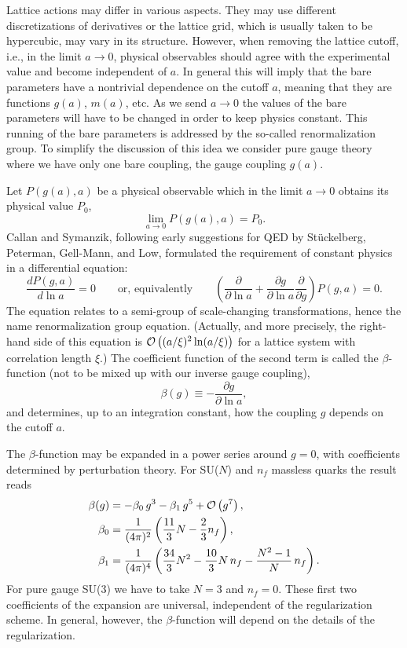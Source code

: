 Lattice actions may differ in various aspects. They may use different
discretizations of derivatives or the lattice grid, which is usually taken to
be hypercubic, may vary in its structure. However, when removing the lattice
cutoff, i.e., in the limit $a \to 0$, physical observables should agree with
the experimental value and become independent of $a$. In general this will
imply that the bare parameters have a nontrivial dependence on the cutoff $a$,
meaning that they are functions $g(a)$, $m(a)$, etc. As we send $a \to 0$ the
values of the bare parameters will have to be changed in order to keep physics
constant. This running of the bare parameters is addressed by the so-called
renormalization group. To simplify the discussion of this idea we consider pure
gauge theory where we have only one bare coupling, the gauge coupling $g(a)$.

Let $P(g(a), a)$ be a physical observable which in the limit $a \to 0$ obtains
its physical value $P_0$,
\begin{equation}
  \lim_{a\to 0} P(g(a), a) = P_0 .
\end{equation}
Callan and Symanzik, following early suggestions for QED by St\"uckelberg,
Peterman, Gell-Mann, and Low, formulated the requirement of constant physics in
a differential equation:
\begin{equation}
  \frac{dP(g, a)}{d\ln a} = 0 \qquad \text{or, equivalently} \qquad
  \left(\frac{\partial}{\partial\ln a} + \frac{\partial g}{\partial\ln a}
    \frac{\partial}{\partial g}\right) P(g, a) = 0 .
\end{equation}
The equation relates to a semi-group of scale-changing transformations, hence
the name renormalization group equation. (Actually, and more precisely, the
right-hand side of this equation is $\mathcal{O}\left((a/\xi)^2 \ln(a/\xi)\right)$ for a
lattice system with correlation length $\xi$.) The coefficient function of the
second term is called the $\beta$-function (not to be mixed up with our inverse
gauge coupling),
\begin{equation}
  \beta(g) \equiv -\frac{\partial g}{\partial\ln a} ,
\end{equation}
and determines, up to an integration constant, how the coupling $g$ depends on
the cutoff $a$.

The $\beta$-function may be expanded in a power series around $g = 0$, with
coefficients determined by perturbation theory. For SU($N$) and $n_f$ massless
quarks the result reads
\begin{equation}
\begin{aligned}
  \beta(g) &= -\beta_0\,g^3 - \beta_1\,g^5 + \mathcal{O}\left(g^7\right) ,\\
  \beta_0 &= \frac{1}{(4\pi)^2}\left(\frac{11}{3}N - \frac{2}{3}n_f\right) ,\\
  \beta_1 &= \frac{1}{(4\pi)^4}\left(\frac{34}{3}N^2 - \frac{10}{3}N\,n_f
    - \frac{N^2 - 1}{N}\,n_f\right) .
\end{aligned}
\end{equation}
For pure gauge SU(3) we have to take $N = 3$ and $n_f = 0$. These first two
coefficients of the expansion are universal, independent of the regularization
scheme. In general, however, the $\beta$-function will depend on the details of
the regularization.

